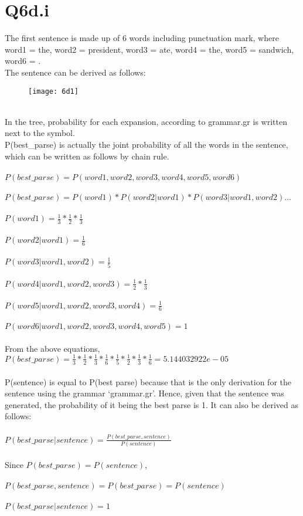 \documentclass[12pt]{article}
\begin{document}
\section*{Q6d.i}
The first sentence is made up of 6 words including punctuation mark, where word1 = the, word2 = president, word3 = ate, word4 = the, word5 = sandwich, word6 = .\\
The sentence can be derived as follows:\\
\begin{figure}[h]
	\texttt{[image: 6d1]}
	\centering
\end{figure}
\\
In the tree, probability for each expansion, according to grammar.gr is written next to the symbol.\\
P(best\_parse) is actually the joint probability of all the words in the sentence, which can be written as follows by chain rule.\\
\\
\(P(best\_parse) = P(word1,word2,word3,word4,word5,word6)\)\\
\\
\(P(best\_parse) = P(word1)*P(word2|word1)*P(word3|word1,word2)...\)\\
\\
\(P(word1) = \frac{1}{3}*\frac{1}{2}*\frac{1}{3}\)\\
\\
\(P(word2|word1) = \frac{1}{6}\)\\
\\
\(P(word3|word1,word2) = \frac{1}{5}\)\\
\\
\(P(word4|word1,word2,word3) = \frac{1}{2}*\frac{1}{3}\)\\
\\
\(P(word5|word1,word2,word3,word4) = \frac{1}{6}\)\\
\\
\(P(word6|word1,word2,word3,word4,word5) = 1\)\\
\\
From the above equations,\\
\(P(best\_parse) = \frac{1}{3}*\frac{1}{2}*\frac{1}{3}*\frac{1}{6}*\frac{1}{5}*\frac{1}{2}*\frac{1}{3}*\frac{1}{6}= 5.144032922e-05\) \\
\\
P(sentence) is equal to P(best parse) because that is the only derivation for the sentence using the grammar ‘grammar.gr’. Hence, given that the sentence was generated, the probability of it being the best parse is 1. It can also be derived as follows:\\
\\
\(P(best\_parse|sentence) = \frac{P(best\_parse, sentence)}{P(sentence)}\)\\
\\
Since \(P(best\_parse) = P(sentence)\),\\
\\
\(P(best\_parse, sentence) = P(best\_parse) = P(sentence)\) \\
\\
\(P(best\_parse|sentence) = 1\)
\end{document}
